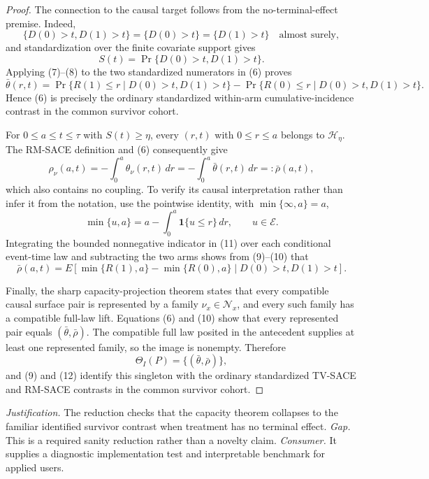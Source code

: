 \documentclass{article}
\begin{document}
\begin{proof}
The connection to the causal target follows from the no-terminal-effect premise.  Indeed,
\[
\{D(0)>t,D(1)>t\}=\{D(0)>t\}=\{D(1)>t\}
\quad\text{almost surely}, \tag{7}
\]
and standardization over the finite covariate support gives
\[
S(t)=\Pr\{D(0)>t,D(1)>t\}. \tag{8}
\]
Applying (7)--(8) to the two standardized numerators in (6) proves
\[
\bar\theta(r,t)
=\Pr\{R(1)\leq r\mid D(0)>t,D(1)>t\}
-\Pr\{R(0)\leq r\mid D(0)>t,D(1)>t\}. \tag{9}
\]
Hence (6) is precisely the ordinary standardized within-arm cumulative-incidence contrast in the common survivor cohort.

For \(0\leq a\leq t\leq\tau\) with \(S(t)\geq\eta\), every \((r,t)\) with \(0\leq r\leq a\) belongs to \(\mathcal H_\eta\).  The RM-SACE definition and (6) consequently give
\[
\rho_\nu(a,t)
=-\int_0^a\theta_\nu(r,t)\,dr
=-\int_0^a\bar\theta(r,t)\,dr
=:\bar\rho(a,t), \tag{10}
\]
which also contains no coupling.  To verify its causal interpretation rather than infer it from the notation, use the pointwise identity, with \(\min\{\infty,a\}=a\),
\[
\min\{u,a\}=a-\int_0^a\mathbf 1\{u\leq r\}\,dr,
\qquad u\in\mathcal E. \tag{11}
\]
Integrating the bounded nonnegative indicator in (11) over each conditional event-time law and subtracting the two arms shows from (9)--(10) that
\[
\bar\rho(a,t)
=E\!\left[\min\{R(1),a\}-\min\{R(0),a\}
\mid D(0)>t,D(1)>t\right]. \tag{12}
\]

Finally, the sharp capacity-projection theorem states that every compatible causal surface pair is represented by a family \(\nu_x\in\mathcal N_x\), and every such family has a compatible full-law lift.  Equations (6) and (10) show that every represented pair equals \((\bar\theta,\bar\rho)\).  The compatible full law posited in the antecedent supplies at least one represented family, so the image is nonempty.  Therefore
\[
\Theta_I(P)=\{(\bar\theta,\bar\rho)\},
\]
and (9) and (12) identify this singleton with the ordinary standardized TV-SACE and RM-SACE contrasts in the common survivor cohort.
\end{proof}
\par\smallskip\noindent \textit{Justification.} The reduction checks that the capacity theorem collapses to the familiar identified survivor contrast when treatment has no terminal effect. \textit{Gap.} This is a required sanity reduction rather than a novelty claim. \textit{Consumer.} It supplies a diagnostic implementation test and interpretable benchmark for applied users.
\end{document}
